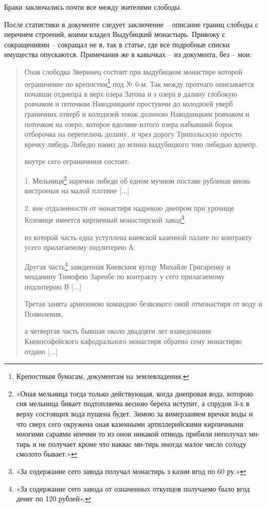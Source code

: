 Браки заключались почти все между жителями слободы.

После статистики в документе следует заключение – описание границ слободы с перечнем строений, коими владел Выдубицкий монастырь. Привожу с  сокращениями – сокращал не я, так в статье, где все подробные списки имущества опускаются. Примечания же в кавычках – из документа, без – мои:

\begin{quotation}
Оная слободка Зверинец состоит при выдубицком монастире которой ограничение по крепостям\footnote{Крепостным бумагам, документам на землевладения.} под № 6-м. Так между протчаго описывается почавши отднепра в верх озера Затона и з озера в далину глобокую ровчаком и поточком Наводницким простуючи до колодязей уверб граничних отверб и колодязей тоюж долиною Наводницким ровчаком и поточком на озеро, которое вдолине изтого озера набывший борок отборочка на перепеличь долину, и чрез дорогу Трипольскую просто вречку либедь Либедю наниз до млина выдубицкого тою либедью вднепр.

внутре сего ограничения состоят:

1. Мельниця\footnote{«Оная мельница тогда только действующая, когда днепровая вода, которою сия мельница бивает подтопляема весною береха иступит, а спрудов 3-х в верху состоящих вода пущена будет. Зимою за вимерзанием вречки воды и что сверх сего окружена оная казенными артиллерийскими кирпичными многими сараями ипечми то из онои никакой отнюдь прибили неполучал мн-тирь и не получает кроме что наквас мн-тирь иногда малое число солоду смолото бывает.»} наречки либеди об едном мучном поставе рубленая вновь вистроеная на малой плотине [...]

2. вне отдаленности от монастиря надрекою днепром при урочище Козовице имеется кирпичный монастирской завод\footnote{«За содержание сего завода получал монастирь з казни вгод по 60 ру.»}.

из которой часть една уступлена киевской казенной палате по контракту усего прилагаемому подлитерею А.

Другая часть\footnote{«За содержание сего завода от означенных откупцов получаемо было вгод денег по 120 рублей».} заведенная Киевским купцу Михайле Григаренку и мещанину Тимофею Заренбе по контракту у сего прилагаемому подлитерою В [...]

Третая занята армизоною командою безвсякого оной отмонастиря от воду и Позволения,

а четвертая часть бывшая около двадцяти лет взаведовании Киевософейского кафодрального монастиря обратно сему монастирю отдано [...]


\end{quotation}
